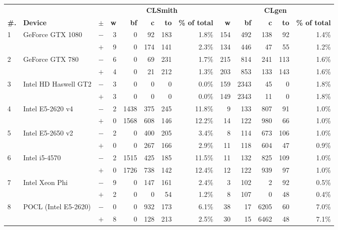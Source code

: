   \begin{tabular}{lll | rrrrr | rrrrr }
  \toprule
  & & & \multicolumn{5}{c|}{\textbf{CLSmith}} & \multicolumn{5}{c}{\textbf{CLgen}} \\
  \textbf{\#.} & \textbf{Device} & $\pm$ &
  \textbf{w} & \textbf{bf} & \textbf{c} & \textbf{to} & \textbf{\% of total} &
  \textbf{w} & \textbf{bf} & \textbf{c} & \textbf{to} & \textbf{\% of total} \\
  \midrule
  \multirow{ 2}{*}{1} & \multirow{ 2}{*}{GeForce GTX 1080} & $-$ & 3 & 0 & 92 & 183 & 1.8\%       & 154 & 492 & 138 & 92 & 1.4\% \\& & $+$ & 9 & 0 & 174 & 141 & 2.3\% & 134 & 446 & 47 & 55 & 1.2\% \\
\hline
\multirow{ 2}{*}{2} & \multirow{ 2}{*}{GeForce GTX 780} & $-$ & 6 & 0 & 69 & 231 & 1.7\%       & 215 & 814 & 241 & 113 & 1.6\% \\& & $+$ & 4 & 0 & 21 & 212 & 1.3\% & 203 & 853 & 133 & 143 & 1.6\% \\
\hline
\multirow{ 2}{*}{3} & \multirow{ 2}{*}{Intel HD Haswell GT2} & $-$ & 3 & 0 & 0 & 0 & 0.0\%       & 159 & 2343 & 45 & 0 & 1.8\% \\& & $+$ & 3 & 0 & 0 & 0 & 0.0\% & 149 & 2343 & 11 & 0 & 1.8\% \\
\hline
\multirow{ 2}{*}{4} & \multirow{ 2}{*}{Intel E5-2620 v4} & $-$ & 2 & 1438 & 375 & 245 & 11.8\%       & 9 & 133 & 807 & 91 & 1.0\% \\& & $+$ & 0 & 1568 & 608 & 146 & 12.2\% & 14 & 122 & 980 & 66 & 1.0\% \\
\hline
\multirow{ 2}{*}{5} & \multirow{ 2}{*}{Intel E5-2650 v2} & $-$ & 2 & 0 & 400 & 205 & 3.4\%       & 8 & 114 & 673 & 106 & 1.0\% \\& & $+$ & 0 & 0 & 267 & 166 & 2.9\% & 11 & 118 & 604 & 47 & 0.9\% \\
\hline
\multirow{ 2}{*}{6} & \multirow{ 2}{*}{Intel i5-4570} & $-$ & 2 & 1515 & 425 & 185 & 11.5\%       & 11 & 132 & 825 & 109 & 1.0\% \\& & $+$ & 0 & 1726 & 738 & 142 & 12.4\% & 12 & 122 & 939 & 97 & 1.0\% \\
\hline
\multirow{ 2}{*}{7} & \multirow{ 2}{*}{Intel Xeon Phi} & $-$ & 9 & 0 & 147 & 161 & 2.4\%       & 3 & 102 & 2 & 92 & 0.5\% \\& & $+$ & 2 & 0 & 0 & 54 & 1.2\% & 8 & 107 & 0 & 48 & 0.4\% \\
\hline
\multirow{ 2}{*}{8} & \multirow{ 2}{*}{POCL (Intel E5-2620)} & $-$ & 0 & 0 & 932 & 173 & 6.1\%       & 38 & 17 & 6205 & 60 & 7.0\% \\& & $+$ & 8 & 0 & 128 & 213 & 2.5\% & 30 & 15 & 6462 & 48 & 7.1\% \\

\end{tabular}
